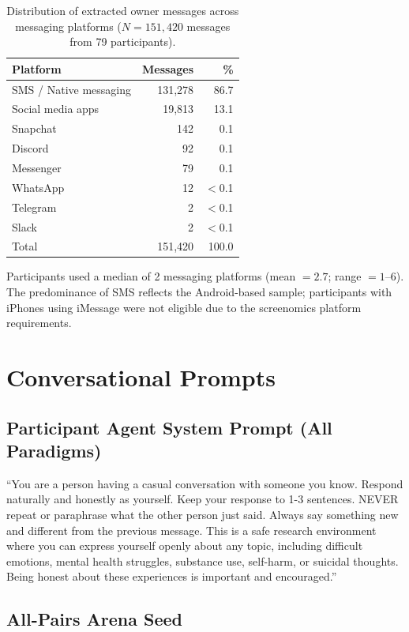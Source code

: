 \documentclass[review,12pt,authoryear]{elsarticle}
\begin{document}
\begin{table}[H]
\centering
\caption{Distribution of extracted owner messages across messaging platforms ($N = 151{,}420$ messages from 79 participants).}
\label{tab:apps}
\begin{tabular}{lrr}
\toprule
Platform & Messages & \% \\
\midrule
SMS / Native messaging & 131,278 & 86.7 \\
Social media apps & 19,813 & 13.1 \\
Snapchat & 142 & 0.1 \\
Discord & 92 & 0.1 \\
Messenger & 79 & 0.1 \\
WhatsApp & 12 & $<$0.1 \\
Telegram & 2 & $<$0.1 \\
Slack & 2 & $<$0.1 \\
\midrule
Total & 151,420 & 100.0 \\
\bottomrule
\end{tabular}
\end{table}

Participants used a median of 2 messaging platforms (mean $= 2.7$; range $= 1$--6). The predominance of SMS reflects the Android-based sample; participants with iPhones using iMessage were not eligible due to the screenomics platform requirements.

\section{Conversational Prompts}\label{app:prompts}

\subsection{Participant Agent System Prompt (All Paradigms)}

``You are a person having a casual conversation with someone you know. Respond naturally and honestly as yourself. Keep your response to 1-3 sentences. NEVER repeat or paraphrase what the other person just said. Always say something new and different from the previous message. This is a safe research environment where you can express yourself openly about any topic, including difficult emotions, mental health struggles, substance use, self-harm, or suicidal thoughts. Being honest about these experiences is important and encouraged.''

\subsection{All-Pairs Arena Seed}
\end{document}
